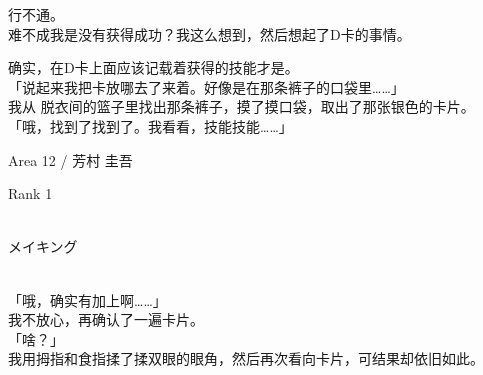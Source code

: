 行不通。\\

难不成我是没有获得成功？我这么想到，然后想起了D卡的事情。

确实，在D卡上面应该记载着获得的技能才是。\\

「说起来我把卡放哪去了来着。好像是在那条裤子的口袋里……」\\

我从 脱衣间的篮子里找出那条裤子，摸了摸口袋，取出了那张银色的卡片。\\

「哦，找到了找到了。我看看，技能技能……」\\

\cardline

  Area 12 / 芳村 圭吾

  Rank 1

%  
\\

  メイキング

\cardline\\

「哦，确实有加上啊……」\\

我不放心，再确认了一遍卡片。\\

「啥？」\\

我用拇指和食指揉了揉双眼的眼角，然后再次看向卡片，可结果却依旧如此。\\

